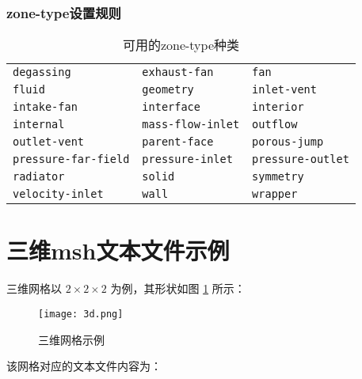 \documentclass[lang=cn,11pt,a4paper]{elegantpaper}
\begin{document}
\subsubsection{zone-type设置规则}\label{zone-type}
\begin{table}[!htb]
  \centering
  \caption{可用的zone-type种类}
  \begin{tabular}{*{3}{l}}
   \hline
   \texttt{degassing}       & \texttt{exhaust-fan}   & \texttt{fan} \\
   \texttt{fluid}           & \texttt{geometry}      & \texttt{inlet-vent} \\
   \texttt{intake-fan}      & \texttt{interface}     & \texttt{interior} \\
   \texttt{internal}        & \texttt{mass-flow-inlet}          & \texttt{outflow} \\
   \texttt{outlet-vent}     & \texttt{parent-face}   & \texttt{porous-jump} \\
   \texttt{pressure-far-field}         & \texttt{pressure-inlet}     & \texttt{pressure-outlet} \\
   \texttt{radiator}        & \texttt{solid}         & \texttt{symmetry} \\
   \texttt{velocity-inlet}  & \texttt{wall}          & \texttt{wrapper} \\
   \hline
  \end{tabular}
\end{table}

\section{三维msh文本文件示例}

三维网格以 $2\times2\times2$ 为例，其形状如图 \ref{3dMesh} 所示：
\begin{figure}[!htb]
\centering
\texttt{[image: 3d.png]}
\caption{三维网格示例}
\label{3dMesh}
\end{figure}

该网格对应的文本文件内容为：
\end{document}
